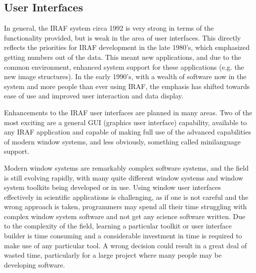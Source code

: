 \subsection {User Interfaces}

In general, the IRAF system circa 1992 is very strong in terms of the
functionality provided, but is weak in the area of user interfaces.  This
directly reflects the priorities for IRAF development in the late 1980's,
which emphasized getting numbers out of the data.  This meant new
applications, and due to the common environment, enhanced system support for
these applications (e.g. the new image structures).  In the early 1990's,
with a wealth of software now in the system and more people than ever using
IRAF, the emphasis has shifted towards ease of use and improved user
interaction and data display.

Enhancements to the IRAF user interfaces are planned in many areas.  Two of
the most exciting are a general GUI (graphics user interface) capability,
available to any IRAF application and capable of making full use of the
advanced capabilities of modern window systems, and less obviously, something
called minilanguage support.

Modern window systems are remarkably complex software systems, and the field
is still evolving rapidly, with many quite different window systems and
window system toolkits being developed or in use.  Using window user
interfaces effectively in scientific applications is challenging, as if one
is not careful and the wrong approach is taken, programmers may spend all
their time struggling with complex window system software and not get any
science software written.  Due to the complexity of the field, learning a
particular toolkit or user interface builder is time consuming and a
considerable investment in time is required to make use of any particular
tool.  A wrong decision could result in a great deal of wasted time,
particularly for a large project where many people may be developing
software.

%
%

